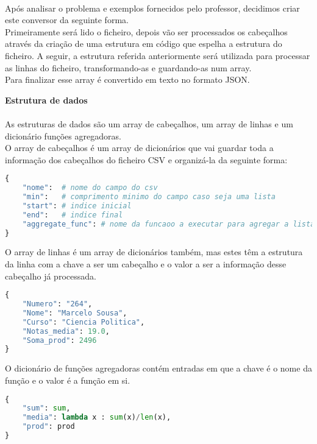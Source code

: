 \documentclass[11pt,a4paper]{report}
\begin{document}
\paragraph{}
Após analisar o problema e exemplos fornecidos pelo professor, decidimos criar este conversor da seguinte forma. \\
Primeiramente será lido o ficheiro, depois vão ser processados os cabeçalhos através da criação de uma estrutura em código que espelha a estrutura do ficheiro. A seguir, a estrutura referida anteriormente será utilizada para processar as linhas do ficheiro, transformando-as e guardando-as num array.\\
Para finalizar esse array é convertido em texto no formato JSON.\\

\item\textbf{Estrutura de dados}
\paragraph{}
As estruturas de dados são um array de cabeçalhos,  um array de linhas e um dicionário funções agregadoras. \\
O array de cabeçalhos é um array de dicionários que vai guardar toda a informação dos cabeçalhos do  
ficheiro CSV e organizá-la da seguinte forma: \\
\begin{lstlisting}[language=Python]
{
    "nome":  # nome do campo do csv
    "min":   # comprimento minimo do campo caso seja uma lista
    "start": # indice inicial
    "end":   # indice final
    "aggregate_func": # nome da funcaoo a executar para agregar a lista
}
\end{lstlisting}

O array de linhas é um array de dicionários também, mas estes têm a estrutura da linha com a chave a ser um cabeçalho e o valor a ser a informação desse cabeçalho já processada.  \\
\begin{lstlisting}[language=Python]
{
    "Numero": "264",
    "Nome": "Marcelo Sousa",
    "Curso": "Ciencia Politica",
    "Notas_media": 19.0,
    "Soma_prod": 2496
}
\end{lstlisting}

O dicionário de funções agregadoras contém entradas em que a chave é o nome da função e o valor é a função em si. 

\begin{lstlisting}[language=Python]
{
    "sum": sum,
    "media": lambda x : sum(x)/len(x),
    "prod": prod
}
\end{lstlisting}
\end{document}
